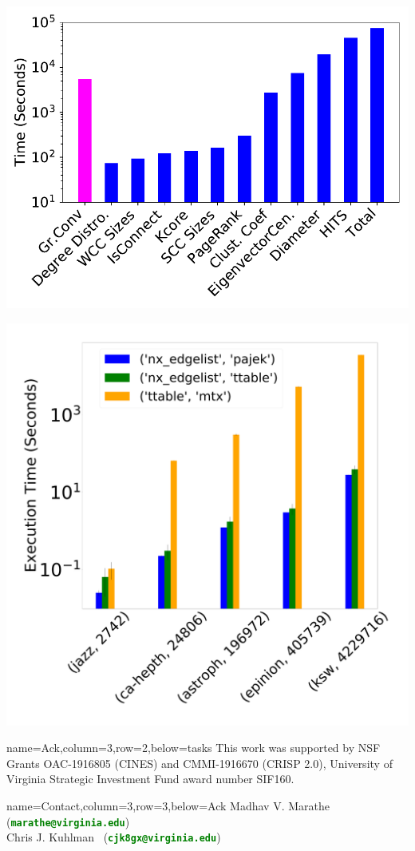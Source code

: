 \documentclass[landscape,paperwidth=70in,paperheight=46in,fontscale=0.225]{baposter} %
\begin{document}
\begin{poster}
{\hfill
\begin{minipage}{0.45\linewidth}
\includegraphics[scale=0.27]{figures/g4_timing.pdf} 
\end{minipage}
\hfill
\begin{minipage}{0.45\linewidth}
\includegraphics[scale=0.038]{figures/scatter_bar_to_ttable.pdf}
\end{minipage}

}

          {name=Ack,column=3,row=2,below=tasks}{
{\footnotesize
This work was supported by
NSF Grants OAC-1916805 (CINES) and CMMI-1916670 (CRISP 2.0),
University of Virginia Strategic Investment Fund award
number SIF160.
}
}

          {name=Contact,column=3,row=3,below=Ack}{
{\footnotesize
{Madhav V. Marathe~ (\textcolor{green}{\textbf{\texttt{marathe@virginia.edu}}})}\\
{Chris J. Kuhlman~ (\textcolor{green}{\textbf{\texttt{cjk8gx@virginia.edu}}})}
}}

\end{poster}
\end{document}
